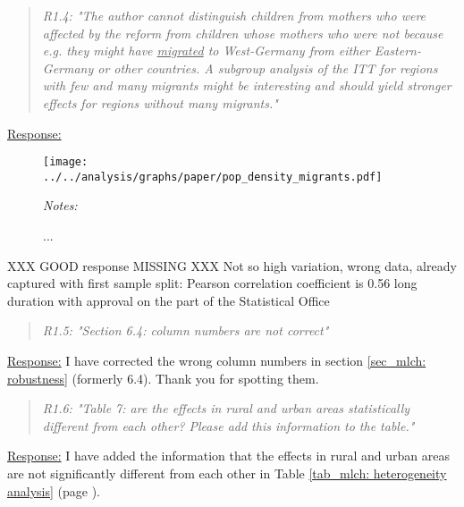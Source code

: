 \bigskip\bigskip





\bigskip
{}
\begin{quote}
	\textit{R1.4: "The author cannot distinguish children from mothers who were affected by the reform from children whose mothers who were not because e.g. they might have \underline{migrated} to West-Germany from either Eastern-Germany or other countries. A subgroup analysis of the ITT for regions with few and many migrants might be interesting and should yield stronger effects for regions without many migrants."}
\end{quote}
\underline{Response:}




\begin{figure}[H] \centering
	\caption{...}\label{key}
	\texttt{[image: ../../analysis/graphs/paper/pop\_density\_migrants.pdf]}
	\begin{minipage}{0.9\linewidth}
		\scriptsize{\emph{Notes:} }
	\end{minipage}
\end{figure}

{\color{red} XXX GOOD response MISSING XXX
Not so high variation, wrong data, already captured with first sample split: Pearson correlation coefficient is 0.56
long duration with approval on the part of the Statistical Office}




\bigskip\bigskip
{}
\begin{quote}
	\textit{R1.5: "Section 6.4: column numbers are not correct"}
\end{quote}
\underline{Response:} I have corrected the wrong column numbers in section \ref{sec_mlch: robustness} (formerly 6.4). Thank you for spotting them.

\bigskip\bigskip
{}
\begin{quote}
	\textit{R1.6: "Table 7: are the effects in rural and urban areas statistically different from each other? Please add this information to the table."}
\end{quote}
\underline{Response:} I have added the information that the effects in rural and urban areas are not significantly different from each other in Table \ref{tab_mlch: heterogeneity analysis} (page \pageref{tab_mlch: heterogeneity analysis}).

